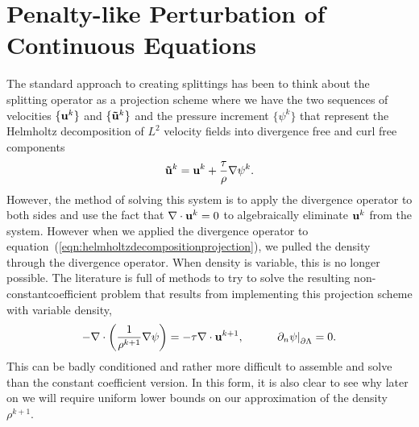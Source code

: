 \documentclass[letterpaper]{erdc}
\begin{document}
%
%
%
\section{Penalty-like Perturbation of Continuous Equations}
The standard approach to creating splittings has been to think about the splitting operator as a projection scheme where we have the two sequences of velocities $\{\textbf{u}^{k}\}$ and $\{\mathbf{\tilde{u}}^{k}\}$ and the pressure increment $\{\psi^{k}\}$ that represent the Helmholtz decomposition of $L^{2}$ velocity fields into divergence free and curl free components
\begin{equation}\label{eqn:helmholtzdecompositionprojection}
  \mathbf{\tilde{u}}^{k} = \textbf{u}^{k} + \frac{\tau}{\rho}\nabla \psi^{k}.
\end{equation}
 However, the method of solving this system is to apply the divergence operator to both sides and use the fact that $\nabla\cdot \textbf{u}^k = 0$ to algebraically eliminate $\textbf{u}^k$ from the system.  However when we applied the divergence operator to equation~(\ref{eqn:helmholtzdecompositionprojection}), we pulled the density through the divergence operator.   When density is variable, this is no longer possible.  The literature is full of methods to try to solve the resulting non-constantcoefficient problem that results from implementing this projection scheme with variable density,
\begin{equation}
  -\nabla\cdot\left(\frac{1}{\rho^{k+1}} \nabla\psi \right) = -\tau\nabla\cdot \textbf{u}^{k+1},  \hspace{1cm} \left.\partial_n \psi\right|_{\partial\Lambda} = 0.
\end{equation}  
This can be badly conditioned and rather more difficult to assemble and solve than the constant coefficient version.  In this form, it is also clear to see why later on we will require uniform lower bounds on our approximation of the density $\rho^{k+1}$.
\end{document}
